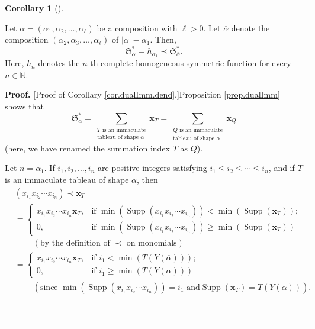 \documentclass
[numbers=enddot,12pt,final,onecolumn,notitlepage,abstracton]{scrartcl}%
\theoremstyle{definition}
\newtheorem{coro}[theo]{Corollary}
\newenvironment{corollary}[1][]
{\begin{coro}[#1]\begin{leftbar}}
{\end{leftbar}\end{coro}}
\newenvironment{proof}[1][Proof]{\noindent\textbf{#1.} }{\ \rule{0.5em}{0.5em}}
\let\sumnonlimits\sum
\renewcommand{\sum}{\sumnonlimits\limits}
\begin{document}
\begin{corollary}
\label{cor.dualImm.dend}Let $\alpha=\left(  \alpha_{1},\alpha_{2}%
,\ldots,\alpha_{\ell}\right)  $ be a composition with $\ell>0$. Let
$\overline{\alpha}$ denote the composition $\left(  \alpha_{2},\alpha
_{3},\ldots,\alpha_{\ell}\right)  $ of $\left\vert \alpha\right\vert
-\alpha_{1}$. Then,%
\[
\mathfrak{S}_{\alpha}^{\ast}=h_{\alpha_{1}}\left.  \prec\right.
\mathfrak{S}_{\overline{\alpha}}^{\ast}.
\]
Here, $h_{n}$ denotes the $n$-th complete homogeneous symmetric function for
every $n\in\mathbb{N}$.
\end{corollary}

\begin{proof}
[Proof of Corollary \ref{cor.dualImm.dend}.]Proposition \ref{prop.dualImm}
shows that
\begin{equation}
\mathfrak{S}_{\alpha}^{\ast}=\sum_{\substack{T\text{ is an immaculate}%
\\\text{tableau of shape }\alpha}}\mathbf{x}_{T}=\sum_{\substack{Q\text{ is an
immaculate}\\\text{tableau of shape }\alpha}}\mathbf{x}_{Q}
\label{pf.cor.dualImm.dend.LHS}%
\end{equation}
(here, we have renamed the summation index $T$ as $Q$).

Let $n=\alpha_{1}$. If $i_{1},i_{2},\ldots,i_{n}$ are positive integers
satisfying $i_{1}\leq i_{2}\leq\cdots\leq i_{n}$, and if $T$ is an immaculate
tableau of shape $\overline{\alpha}$, then%
\begin{align}
&  \left(  x_{i_{1}}x_{i_{2}}\cdots x_{i_{n}}\right)  \left.  \prec\right.
\mathbf{x}_{T}\nonumber\\
&  =
\begin{cases}
x_{i_{1}}x_{i_{2}}\cdots x_{i_{n}}\mathbf{x}_{T}, & \text{if } \min\left(
\operatorname*{Supp}\left(  x_{i_{1}}x_{i_{2}}\cdots x_{i_{n}}\right)
\right)  <\min\left(  \operatorname*{Supp}\left(  \mathbf{x}_{T}\right)
\right)  ;\\
0, & \text{if }\min\left(  \operatorname*{Supp}\left(  x_{i_{1}}x_{i_{2}%
}\cdots x_{i_{n}}\right)  \right)  \geq\min\left(  \operatorname*{Supp}\left(
\mathbf{x}_{T}\right)  \right)
\end{cases}
\nonumber\\
&  \ \ \ \ \ \ \ \ \ \ \left(  \text{by the definition of }\left.
\prec\right.  \text{ on monomials}\right) \nonumber\\
&  =
\begin{cases}
x_{i_{1}}x_{i_{2}}\cdots x_{i_{n}}\mathbf{x}_{T}, & \text{if } i_{1}%
<\min\left(  T\left(  Y\left(  \overline{\alpha}\right)  \right)  \right)  ;\\
0, & \text{if }i_{1}\geq\min\left(  T\left(  Y\left(  \overline{\alpha
}\right)  \right)  \right)
\end{cases}
\label{pf.cor.dualImm.dend.1}\\
&  \ \ \ \ \ \ \ \ \ \ \left(  \text{since }\min\left(  \operatorname*{Supp}%
\left(  x_{i_{1}}x_{i_{2}}\cdots x_{i_{n}}\right)  \right)  =i_{1}\text{ and
}\operatorname*{Supp}\left(  \mathbf{x}_{T}\right)  =T\left(  Y\left(
\overline{\alpha}\right)  \right)  \right)  .\nonumber
\end{align}



\end{proof}
\end{document}
